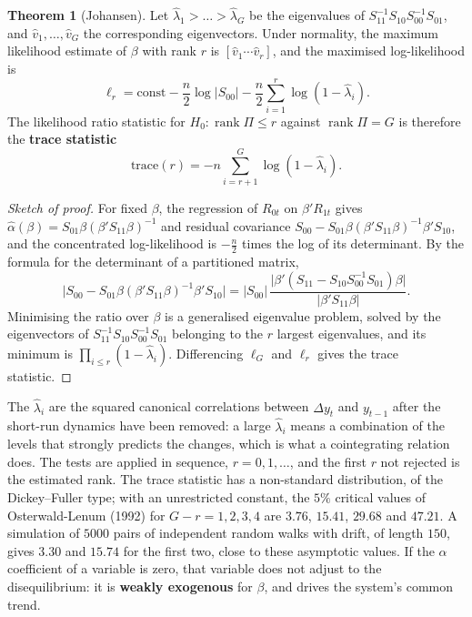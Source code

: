 \documentclass[11pt,a4paper]{article}
\numberwithin{equation}{section}
\DeclareMathOperator{\rank}{rank}
\theoremstyle{definition}
\newtheorem{thm}{Theorem}[subsection]
\begin{document}
\begin{thm}[Johansen]
\label{thm:johansen}
Let $\hat\lambda_1 > \dots > \hat\lambda_G$ be the eigenvalues of $S_{11}^{-1}S_{10}S_{00}^{-1}S_{01}$, and $\hat v_1, \dots, \hat v_G$ the corresponding eigenvectors. Under normality, the maximum
likelihood estimate of $\beta$ with rank $r$ is $[\hat v_1 \cdots \hat v_r]$, and the maximised log-likelihood is
\[
\ell_r = \text{const} - \frac n2\log|S_{00}| - \frac n2\sum_{i=1}^r\log(1 - \hat\lambda_i) .
\]
The likelihood ratio statistic for $H_0\colon\rank\Pi \leq r$ against $\rank\Pi = G$ is therefore the \textbf{trace statistic}
\[
\text{trace}(r) = -n\sum_{i=r+1}^G\log(1 - \hat\lambda_i) .
\]
\end{thm}

\begin{proof}[Sketch of proof]
For fixed $\beta$, the regression of $R_{0t}$ on $\beta'R_{1t}$ gives $\hat\alpha(\beta) = S_{01}\beta(\beta'S_{11}\beta)^{-1}$ and residual covariance $S_{00} - S_{01}\beta(\beta'S_{11}\beta)^{-1}\beta'S_{10}$, and the concentrated
log-likelihood is $-\frac n2$ times the log of its determinant. By the formula for the determinant of a partitioned matrix,
\[
\bigl|S_{00} - S_{01}\beta(\beta'S_{11}\beta)^{-1}\beta'S_{10}\bigr| = |S_{00}|\,\frac{\bigl|\beta'(S_{11} - S_{10}S_{00}^{-1}S_{01})\beta\bigr|}{|\beta'S_{11}\beta|} .
\]
Minimising the ratio over $\beta$ is a generalised eigenvalue problem, solved by the eigenvectors of $S_{11}^{-1}S_{10}S_{00}^{-1}S_{01}$ belonging to the $r$ largest eigenvalues, and
its minimum is $\prod_{i\leq r}(1 - \hat\lambda_i)$. Differencing $\ell_G$ and $\ell_r$ gives the trace statistic.
\end{proof}

The $\hat\lambda_i$ are the squared canonical correlations between $\Delta y_t$ and $y_{t-1}$ after the short-run dynamics have been removed: a large $\hat\lambda_i$ means a combination of
the levels that strongly predicts the changes, which is what a cointegrating relation does. The tests are applied in sequence, $r = 0, 1, \dots$, and
the first $r$ not rejected is the estimated rank. The trace statistic has a non-standard distribution, of the Dickey--Fuller type; with an unrestricted
constant, the $5\%$ critical values of Osterwald-Lenum (1992) for $G - r = 1, 2, 3, 4$ are $3.76$, $15.41$, $29.68$ and $47.21$. A simulation of $5000$ pairs of independent
random walks with drift, of length $150$, gives $3.30$ and $15.74$ for the first two, close to these asymptotic values. If the $\alpha$ coefficient of a
variable is zero, that variable does not adjust to the disequilibrium: it is \textbf{weakly exogenous} for $\beta$, and drives the system's common trend.
\end{document}
